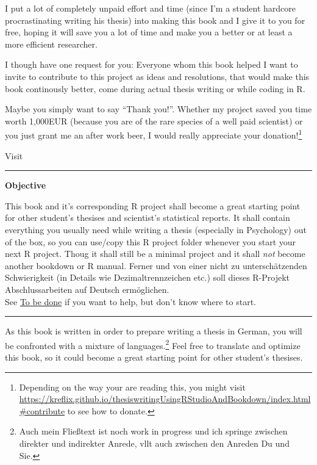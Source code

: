 \documentclass[]{book}
\let\rmarkdownfootnote\footnote%
\def\footnote{\protect\rmarkdownfootnote}
\theoremstyle{definition}
\theoremstyle{definition}
\theoremstyle{remark}
\begin{document}
I put a lot of completely unpaid effort and time (since I'm a student
hardcore procrastinating writing his thesis) into making this book and I
give it to you for free, hoping it will save you a lot of time and make
you a better or at least a more efficient researcher.

I though have one request for you: Everyone whom this book helped I want
to invite to contribute to this project as ideas and resolutions, that
would make this book continously better, come during actual thesis
writing or while coding in R.

Maybe you simply want to say ``Thank you!''. Whether my project saved
you time worth 1,000EUR (because you are of the rare species of a well
paid scientist) or you just grant me an after work beer, I would really
appreciate your donation!\footnote{Depending on the way your are reading
  this, you might visit
  \url{https://kreflix.github.io/thesiswritingUsingRStudioAndBookdown/index.html\#contribute}
  to see how to donate.}

Visit

\begin{center}\rule{0.5\linewidth}{\linethickness}\end{center}

\textbf{Objective}

This book and it's corresponding R project shall become a great starting
point for other student's thesises and scientist's statistical reports.
It shall contain everything you usually need while writing a thesis
(especially in Psychology) out of the box, so you can use/copy this R
project folder whenever you start your next R project. Thoug it shall
still be a minimal project and it shall \emph{not} become another
bookdown or R manual. Ferner und von einer nicht zu unterschätzenden
Schwierigkeit (in Details wie Dezimaltrennzeichen etc.) soll dieses
R-Projekt Abschlussarbeiten auf Deutsch ermöglichen.\\
See \protect\hyperlink{tbd}{To be done} if you want to help, but don't
know where to start.

\begin{center}\rule{0.5\linewidth}{\linethickness}\end{center}

As this book is written in order to prepare writing a thesis in German,
you will be confronted with a mixture of languages.\footnote{Auch mein
  Fließtext ist noch work in progress und ich springe zwischen direkter
  und indirekter Anrede, vllt auch zwischen den Anreden Du und Sie.}
Feel free to translate and optimize this book, so it could become a
great starting point for other student's thesises.
\end{document}
